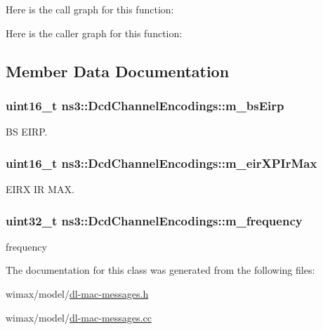 Here is the call graph for this function\+:




Here is the caller graph for this function\+:




\subsection{Member Data Documentation}
\subsubsection[{\texorpdfstring{m\+\_\+bs\+Eirp}{m_bsEirp}}]{\setlength{\rightskip}{0pt plus 5cm}uint16\+\_\+t ns3\+::\+Dcd\+Channel\+Encodings\+::m\+\_\+bs\+Eirp\hspace{0.3cm}{\ttfamily [private]}}\hypertarget{classns3_1_1DcdChannelEncodings_af64539862078bb209f64aecb59cfb2d5}{}\label{classns3_1_1DcdChannelEncodings_af64539862078bb209f64aecb59cfb2d5}


BS E\+I\+RP. 

\subsubsection[{\texorpdfstring{m\+\_\+eir\+X\+P\+Ir\+Max}{m_eirXPIrMax}}]{\setlength{\rightskip}{0pt plus 5cm}uint16\+\_\+t ns3\+::\+Dcd\+Channel\+Encodings\+::m\+\_\+eir\+X\+P\+Ir\+Max\hspace{0.3cm}{\ttfamily [private]}}\hypertarget{classns3_1_1DcdChannelEncodings_acb30ed5e9d84fd53149ce001691203bd}{}\label{classns3_1_1DcdChannelEncodings_acb30ed5e9d84fd53149ce001691203bd}


E\+I\+RX IR M\+AX. 

\subsubsection[{\texorpdfstring{m\+\_\+frequency}{m_frequency}}]{\setlength{\rightskip}{0pt plus 5cm}uint32\+\_\+t ns3\+::\+Dcd\+Channel\+Encodings\+::m\+\_\+frequency\hspace{0.3cm}{\ttfamily [private]}}\hypertarget{classns3_1_1DcdChannelEncodings_a0547d47faca078341233de08bdafba97}{}\label{classns3_1_1DcdChannelEncodings_a0547d47faca078341233de08bdafba97}


frequency 



The documentation for this class was generated from the following files\+:\begin{DoxyCompactItemize}
\item 
wimax/model/\hyperlink{dl-mac-messages_8h}{dl-\/mac-\/messages.\+h}\item 
wimax/model/\hyperlink{dl-mac-messages_8cc}{dl-\/mac-\/messages.\+cc}\end{DoxyCompactItemize}

